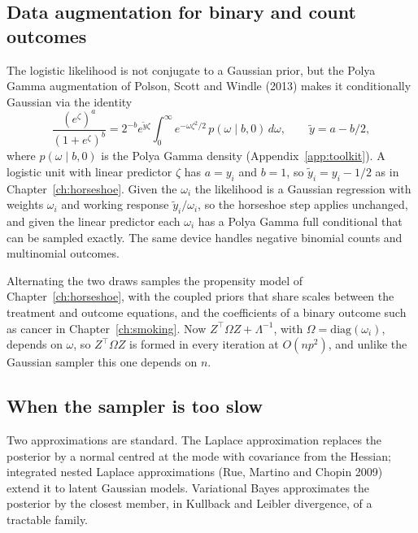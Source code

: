\subsection{Data augmentation for binary and count outcomes}

The logistic likelihood is not conjugate to a Gaussian prior, but the Polya Gamma augmentation of Polson, Scott and Windle (2013) makes it conditionally Gaussian via the identity
\[
\frac{(e^{\zeta})^a}{(1 + e^{\zeta})^b} = 2^{-b}e^{\tilde y\zeta}\int_0^\infty e^{-\omega\zeta^2/2}\,p(\omega \mid b, 0)\,d\omega, \qquad \tilde y = a - b/2,
\]
where $p(\omega\mid b,0)$ is the Polya Gamma density (Appendix~\ref{app:toolkit}). A logistic unit with linear predictor $\zeta$ has $a=y_i$ and $b=1$, so $\tilde y_i=y_i-1/2$ as in Chapter~\ref{ch:horseshoe}. Given the $\omega_i$ the likelihood is a Gaussian regression with weights $\omega_i$ and working response $\tilde y_i/\omega_i$, so the horseshoe step applies unchanged, and given the linear predictor each $\omega_i$ has a Polya Gamma full conditional that can be sampled exactly. The same device handles negative binomial counts and multinomial outcomes.

Alternating the two draws samples the propensity model of Chapter~\ref{ch:horseshoe}, with the coupled priors that share scales between the treatment and outcome equations, and the coefficients of a binary outcome such as cancer in Chapter~\ref{ch:smoking}. Now $Z^\top\Omega Z+\Lambda^{-1}$, with $\Omega=\mathrm{diag}(\omega_i)$, depends on $\omega$, so $Z^\top\Omega Z$ is formed in every iteration at $O(np^2)$, and unlike the Gaussian sampler this one depends on $n$.

\subsection{When the sampler is too slow}

Two approximations are standard. The Laplace approximation replaces the posterior by a normal centred at the mode with covariance from the Hessian; integrated nested Laplace approximations (Rue, Martino and Chopin 2009) extend it to latent Gaussian models. Variational Bayes approximates the posterior by the closest member, in Kullback and Leibler divergence, of a tractable family.


